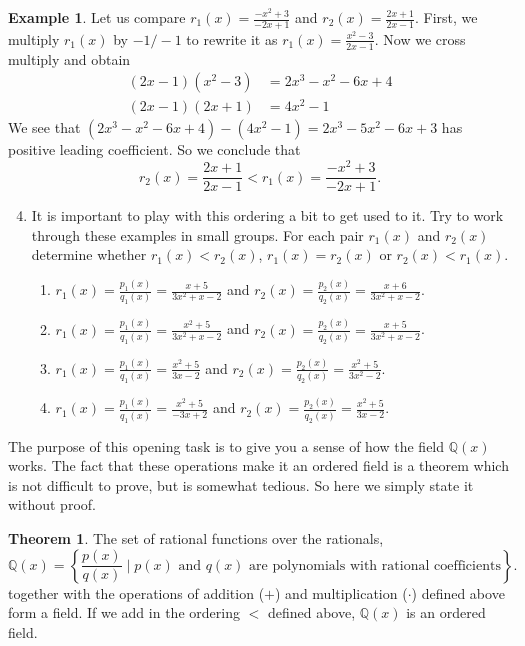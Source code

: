 \documentclass[11pt]{article}
\newenvironment{task}
	{\begin{mdframed}[linecolor=lightgray, linewidth=3pt]\raggedright}
	{\end{mdframed}}
\theoremstyle{definition}
\newtheorem{example}[theorem]{Example}
\newtheorem*{theorem*}{Theorem}
\begin{document}
\begin{task}
\begin{example}
  Let us compare $r_1(x) = \frac{-x^2+3}{-2x+1}$ and $r_2(x) = \frac{2x+1}{2x-1}$. First, we multiply $r_1(x)$ by $-1/-1$ to rewrite it as
  $r_1(x) = \frac{x^2-3}{2x-1}$. Now we cross multiply and obtain
  \begin{align*}
    (2x-1)(x^2-3) &= 2x^3-x^2-6x +4\\
    (2x-1)(2x+1) &= 4x^2-1
  \end{align*}
  We see that $(2x^3-x^2-6x +4)- (4x^2-1) = 2x^3-5x^2-6x+3$ has positive leading coefficient. So we conclude that
  \[r_2(x) = \frac{2x+1}{2x-1} < r_1(x) = \frac{-x^2+3}{-2x+1}. \]
\end{example}

\begin{enumerate}
    \setcounter{enumi}{3}
  \item It is important to play with this ordering a bit to get used to it. Try to work through these examples in small groups. For each pair $r_1(x)$ and $r_2(x)$
    determine whether $r_1(x) < r_2(x)$, $r_1(x)=r_2(x)$ or $r_2(x) < r_1(x)$.
    \begin{enumerate}
      \item  $r_1(x) = \frac{p_1(x)}{q_1(x)} = \frac{x+5}{3x^2+x-2}$ and $r_2(x) = \frac{p_2(x)}{q_2(x)}=\frac{x+6}{3x^2+x-2}$.
        \vspace{1.5in}
      \item  $r_1(x) = \frac{p_1(x)}{q_1(x)} = \frac{x^2+5}{3x^2+x-2}$ and $r_2(x) = \frac{p_2(x)}{q_2(x)}=\frac{x+5}{3x^2+x-2}$.
        \vspace{1.5in}
      \item  $r_1(x) = \frac{p_1(x)}{q_1(x)} = \frac{x^2+5}{3x-2}$ and $r_2(x) = \frac{p_2(x)}{q_2(x)}=\frac{x^2+5}{3x^2-2}$.
        \vspace{1.5in}
      \item  $r_1(x) = \frac{p_1(x)}{q_1(x)} = \frac{x^2+5}{-3x+2}$ and $r_2(x) = \frac{p_2(x)}{q_2(x)}=\frac{x^2+5}{3x-2}$.
        \vspace{1.5in}
    \end{enumerate}
\end{enumerate}

The purpose of this opening task is to give you a sense of how the field $\mathbb{Q}(x)$ works. The fact that these operations make it an ordered field is
a theorem which is not difficult to prove, but is somewhat tedious. So here we simply state it without proof.

\begin{theorem*}
  The set of rational functions over the rationals,
\[ \mathbb{Q}(x) = \left\{ \frac{p(x)}{q(x)} \mid p(x) \text{ and }q(x)\text{ are polynomials with rational coefficients} \right\}.\]
together with the operations of addition ($+$) and multiplication ($\cdot$) defined above form a field. If we add in the ordering $<$ defined above,
$\mathbb{Q}(x)$ is an ordered field.
\end{theorem*}


\end{task}
\end{document}
